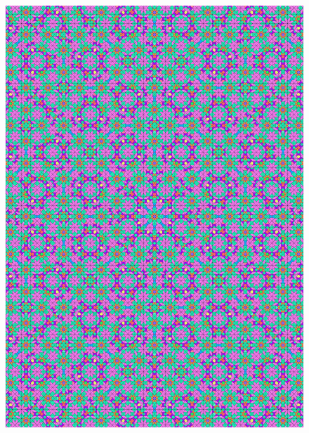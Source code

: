 \documentclass[text.tex]{subfiles}
\begin{document}
\begin{figure}[h!]
\centering
\includegraphics[width=1\textwidth]{img/results/octagon/quasi_polygon-octagon_216421_(-1_4alpha_4).pdf}
\end{figure}
\end{document}
